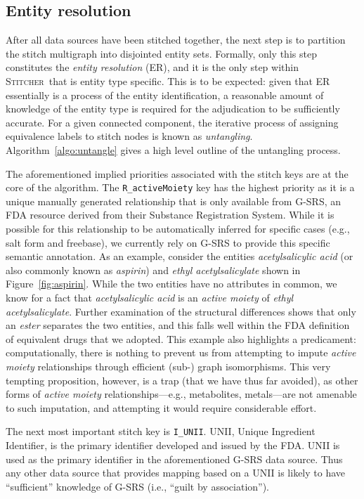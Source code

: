 \documentclass{bmcart}
\newcommand\st{\textsc{Stitcher}}
\begin{document}
\subsection*{Entity resolution}\label{sec:methods-er}
After all data sources have been stitched together, the next step is
to partition the stitch multigraph into disjointed entity sets.
Formally, only this step constitutes the \emph{entity resolution}
(ER), and it is the only step within \st\ that is entity type
specific. This is to be expected: given that ER essentially is a
process of the entity identification, a reasonable amount of knowledge
of the entity type is required for the adjudication to be sufficiently
accurate. For a given connected component, the iterative process of
assigning equivalence labels to stitch nodes is known as
\emph{untangling}. Algorithm~\ref{algo:untangle} gives a high level
outline of the untangling process. 

The aforementioned implied priorities associated with the stitch keys are 
at the core of the algorithm. The \texttt{R\_activeMoiety} key has the
highest priority as it is a unique manually generated relationship
that is only available from G-SRS, an FDA resource derived from their
Substance Registration System. While it is possible for this
relationship to be automatically inferred for specific cases (e.g.,
salt form and freebase), we currently rely on G-SRS to provide this
specific semantic annotation. As an example, consider the entities
\emph{acetylsalicylic acid} (or also commonly known as \emph{aspirin})
and \emph{ethyl acetylsalicylate} shown in Figure~\ref{fig:aspirin}.
While the two entities have no attributes in common, we know for a
fact that \emph{acetylsalicylic acid} is an \emph{active moiety} of
\emph{ethyl acetylsalicylate}. Further examination of the structural
differences shows that only an \emph{ester} separates the two
entities, and this falls well within the FDA definition of equivalent
drugs that we adopted. This example also highlights a predicament:
computationally, there is nothing to prevent us from attempting to
impute \emph{active moiety} relationships through efficient (sub-)
graph isomorphisms. This very tempting proposition, however, is a trap
(that we have thus far avoided), as other forms of \emph{active
  moiety} relationships---e.g., metabolites, metals---are not amenable
to such imputation, and attempting it would require considerable
effort. 

The next most important stitch key is \texttt{I\_UNII}. UNII, Unique
Ingredient Identifier, is the primary identifier developed and issued
by the FDA. UNII is used as the primary identifier in the
aforementioned G-SRS data source. Thus any other data source that
provides mapping based on a UNII is likely to have ``sufficient''
knowledge of G-SRS (i.e., ``guilt by association'').
\end{document}

